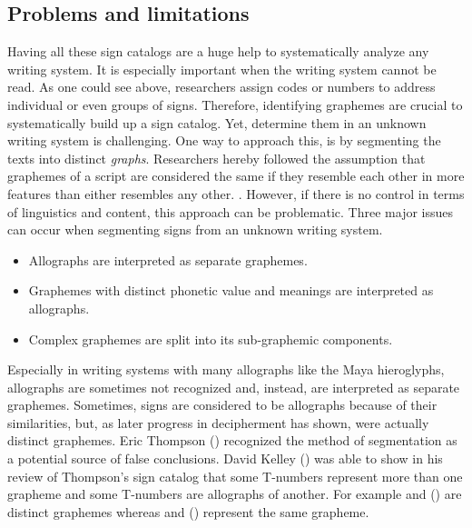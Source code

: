 \documentclass[../main.tex]{subfiles}
\begin{document}
\subsection{Problems and limitations}
Having all these sign catalogs are a huge help to systematically analyze any writing system.
It is especially important when the writing system cannot be read.
As one could see above, researchers assign codes or numbers to address individual or 
even groups of signs.
Therefore, identifying graphemes are crucial to systematically build up a sign catalog.
Yet, determine them in an unknown writing system is challenging.
One way to approach this, is by segmenting the texts into distinct \emph{graphs}.
Researchers hereby followed the assumption that graphemes of a script are considered the same if 
they resemble each other in more features than either resembles any other.
.
However, if there is no control in terms of linguistics and content, 
this approach can be problematic.
Three major issues can occur when segmenting signs from an unknown writing system.
\begin{itemize}
    \item Allographs are interpreted as separate graphemes.
    \item Graphemes with distinct phonetic value and meanings are interpreted as allographs.
    \item Complex graphemes are split into its sub-graphemic components.
\end{itemize}
Especially in writing systems with many allographs like the Maya hieroglyphs,
allographs are sometimes not recognized and, instead, are interpreted as separate graphemes. 
Sometimes, signs are considered to be allographs because of their similarities, 
but, as later progress in decipherment has shown, were actually distinct graphemes.
Eric Thompson (\cite[12\psq]{thompson1962catalog}) recognized the method of segmentation as 
a potential source of false conclusions.
David Kelley (\cite{kelley1962b}) was able to show in his review of Thompson's sign catalog that
some T-numbers represent more than one grapheme and some T-numbers are allographs of another.
For example  and  () are
distinct graphemes whereas  and  ()
represent the same grapheme.
\end{document}
